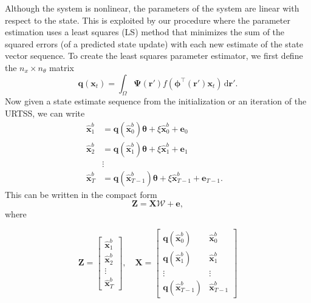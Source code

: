 \documentclass[review,authoryear,3p]{elsarticle}
\begin{document}
Although the system is nonlinear, the parameters of the system are linear with respect to the state. This is exploited by our procedure where the parameter estimation uses a least squares (LS) method that minimizes the sum of the squared errors (of a predicted state update) with each new estimate of the state vector sequence. To create the least squares parameter estimator, we first define the $n_x \times n_{\theta}$ matrix
\begin{equation}
	\mathbf{q}(\mathbf{x}_t) = \int_\Omega \boldsymbol{\Psi}(\mathbf{r}') f(\boldsymbol{\phi}^{\top}(\mathbf{r}')\mathbf{x}_t) \,\textrm{d}\mathbf{r}'.
\end{equation}
Now given a state estimate sequence from the initialization or an iteration of the URTSS, we can write
\begin{align*}
	 \hat{\mathbf x}^b_{1} &= \mathbf{q}(\hat{\mathbf x}^b_0) \boldsymbol{\theta}+\xi\hat{\mathbf x}^b_0+\mathbf e_0 \\
	\hat{\mathbf x}^b_{2} &= \mathbf{q}(\hat{\mathbf x}^b_1) \boldsymbol{\theta}+\xi\hat{\mathbf x}^b_1+\mathbf e_1  \\
	&\vdots& \\
	\hat{\mathbf x}^b_{T}&= \mathbf{q}(\hat{\mathbf x}^b_{T-1}) \boldsymbol{\theta}+\xi\hat{\mathbf x}^b_{T-1}+\mathbf e_{T-1}. 
\end{align*}
This can be written in the compact form
\begin{equation}
	\mathbf Z=\mathbf X \mathcal W+\mathbf{e}, 
\end{equation}
where
\begin{small}
\begin{equation*}
	\mathbf Z=\left[
	\begin{array}{cccc}
		\hat{\mathbf x}^b_{1}\\
		\hat{\mathbf x}^b_{2}\\
		\vdots\\
		\hat{\mathbf x}^b_{T}
	\end{array}
	\right],\quad \mathbf X=\left[
	\begin{array}{cccc}
		\mathbf q(\hat{\mathbf x}^b_0)& \hat{\mathbf x}^b_{0}\\
		\mathbf q(\hat{\mathbf x}^b_1)& \hat{\mathbf x}^b_{1}\\
		\vdots & \vdots\\
		\mathbf q(\hat{\mathbf x}^b_{T-1})& \hat{\mathbf x}^b_{T-1}
	\end{array}
	\right] 
\end{equation*}
\end{small}
\end{document}
